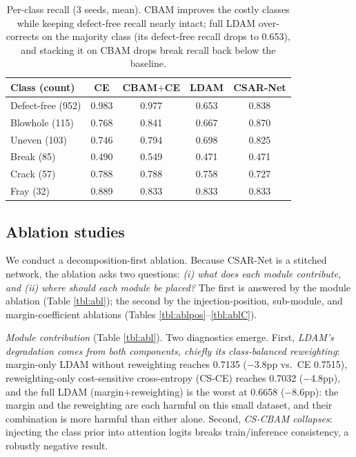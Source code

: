 \documentclass[a4paper,fleqn]{cas-sc}
\begin{document}
\begin{sloppypar}
	\begin{table}[pos=htbp]
		\footnotesize
		\caption{Per-class recall (3 seeds, mean). CBAM improves the costly classes while keeping defect-free recall nearly intact; full LDAM over-corrects on the majority class (its defect-free recall drops to 0.653), and stacking it on CBAM drops break recall back below the baseline.}
		\label{tbl:class}
		\centering
		\begin{tabular}{lcccc}
	\hline
	\textbf{Class (count)} & \textbf{CE} & \textbf{CBAM$+$CE} & \textbf{LDAM} & \textbf{CSAR-Net} \\ \hline
	Defect-free (952) & 0.983 & 0.977 & 0.653 & 0.838 \\
	Blowhole (115) & 0.768 & 0.841 & 0.667 & 0.870 \\
	Uneven (103) & 0.746 & 0.794 & 0.698 & 0.825 \\
	Break (85) & 0.490 & 0.549 & 0.471 & 0.471 \\
	Crack (57) & 0.788 & 0.788 & 0.758 & 0.727 \\
	Fray (32) & 0.889 & 0.833 & 0.833 & 0.833 \\
	\hline
	\end{tabular}
	\end{table}

	\subsection{Ablation studies}
	\label{sec:ablation}
	\par{
		We conduct a decomposition-first ablation. Because CSAR-Net is a stitched network, the ablation asks two questions: \emph{(i) what does each module contribute, and (ii) where should each module be placed?} The first is answered by the module ablation (Table \ref{tbl:abl}); the second by the injection-position, sub-module, and margin-coefficient ablations (Tables \ref{tbl:ablpos}--\ref{tbl:ablC}).
	}

	\par{
		\emph{Module contribution} (Table \ref{tbl:abl}). Two diagnostics emerge. First, \emph{LDAM's degradation comes from both components, chiefly its class-balanced reweighting}: margin-only LDAM without reweighting reaches 0.7135 ($-$3.8pp vs.\ CE 0.7515), reweighting-only cost-sensitive cross-entropy (CS-CE) reaches 0.7032 ($-$4.8pp), and the full LDAM (margin$+$reweighting) is the worst at 0.6658 ($-$8.6pp): the margin and the reweighting are each harmful on this small dataset, and their combination is more harmful than either alone. Second, \emph{CS-CBAM collapses}: injecting the class prior into attention logits breaks train/inference consistency, a robustly negative result.
	}


\end{sloppypar}
\end{document}
